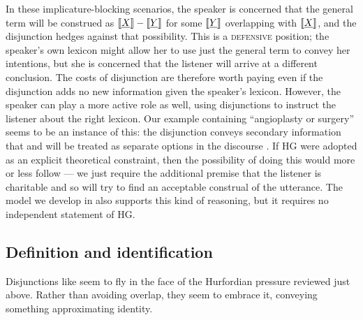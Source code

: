 \documentclass[12pt,twoside]{article}
\renewcommand{\_}{\textbf{\textunderscore\hspace{-4pt}\textunderscore\hspace{-3pt}\textunderscore\hspace{-4pt}\textunderscore}\hspace{0.5pt}}			%
\newcommand{\technicalTerm}[1]{\textsc{#1}}
\begin{document}
In these implicature-blocking scenarios, the speaker is concerned that
the general term  will be construed as
$\llbracket\emph{X\/}\rrbracket-\llbracket\emph{Y\/}\rrbracket$ for some $\llbracket\emph{Y\/}\rrbracket$
overlapping with $\llbracket\emph{X\/}\rrbracket$, and the disjunction hedges
against that possibility. This is a \technicalTerm{defensive} position; the speaker's
own lexicon might allow her to use just the general term to convey her
intentions, but she is concerned that the listener will arrive at a
different conclusion. The costs of disjunction are therefore worth
paying even if the disjunction adds no new information given the
speaker's lexicon.  However, the speaker can play a more active role
as well, using disjunctions to instruct the listener about the right
lexicon. Our  example containing
``angioplasty or surgery'' seems to be an instance of this: the
disjunction conveys secondary information that  and
 will be treated as separate options in the discourse
\citep{Simons:2001}. If HG were adopted as an explicit theoretical
constraint, then the possibility of doing this would more or less
follow --- we just require the additional premise that the listener is
charitable and so will try to find an acceptable construal of the
utterance. The model we develop in  also supports
this kind of reasoning, but it requires no independent statement of
HG.
 

\subsection{Definition and identification}\label{sec:data:definitional}

Disjunctions like  seem to fly in the
face of the Hurfordian pressure reviewed just above. Rather than
avoiding overlap, they seem to embrace it, conveying something
approximating identity.
\end{document}
